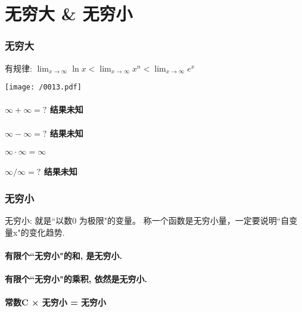 \documentclass[UTF8]{ctexart}
\begin{document}
\part{无穷大 \& 无穷小}

\section{无穷大}


有规律: $ \lim_{x \to \infty} \ln x < \lim_{x \to \infty}  x^n < \lim_{x \to \infty} e^x $

\texttt{[image: /0013.pdf]}


\subsection{$ \infty + \infty = ? $ 结果未知 } 

\subsection{$ \infty - \infty = ? $ 结果未知 } 

\subsection{$ \infty \cdot \infty = \infty $  } 

\subsection{$ \infty / \infty = ? $ 结果未知 } 





\section{无穷小}

无穷小: 就是``以数0 为极限"的变量。 称一个函数是无穷小量，一定要说明``自变量x"的变化趋势.

\subsection{有限个``无穷小"的和, 是无穷小. } 

\subsection{有限个``无穷小"的乘积, 依然是无穷小. } 

\subsection{常数C × 无穷小 = 无穷小 } 
\end{document}
